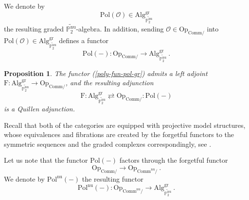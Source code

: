 \documentclass[10pt, oneside]{amsart}
\theoremstyle{plain}
\newtheorem{proposition}[equation]{Proposition}
\newcommand{\alg}{\mathrm{Alg}}
\newcommand{\comm}{\mathrm{Comm}}
\newcommand{\f}{\mathrm{F}}
\newcommand{\gr}{\mathrm{gr}}
\renewcommand{\nu}{\mathrm{nu}}
\renewcommand{\O}{\mathcal{O}}
\newcommand{\op}{\mathrm{Op}}
\newcommand{\pol}{\mathrm{Pol}}
\newcommand{\tP}{{\widetilde{\mathbb{P}^\mathrm{nu}_2}}}
\begin{document}
\begin{definition}\label{poly-def-pol-gr}
We denote by
\begin{equation*}
\pol(\O) \in \alg^\gr_\tP
\end{equation*}
the resulting graded $\tP$-algebra. In addition, sending $\O \in \op_{\comm/}$ into $\pol(\O) \in \alg^\gr_\tP$ defines a functor
\begin{equation}\label{poly-fun-pol-gr}
\pol(-) \colon \op_{\comm/} \to \alg^\gr_\tP \:.
\end{equation}
\end{definition}



\begin{proposition}\label{main-prop}
The functor (\ref{poly-fun-pol-gr}) admits a left adjoint $\f \colon \alg^\gr_\tP \longrightarrow \op_{\comm/}$, and the resulting 
adjunction
\begin{equation*}
\f \colon \alg^\gr_\tP \rightleftarrows \op_{\comm/} : \pol(-)
\end{equation*}
is a Quillen adjunction.
\end{proposition}

Recall that both of the categories are equipped with projective model structures, whose equivalences and fibrations
are created by the forgetful functors to the symmetric sequences and the graded complexes correspondingly, see \cite{Hinich}.

Let us note that the functor $\pol(-)$ factors through the forgetful functor
\begin{equation*}
\op_{\comm/} \longrightarrow \op_{\comm^\nu/} \:.
\end{equation*}
We denote by $\pol^\nu(-)$ the resulting functor
\begin{equation*}
\pol^\nu(-) \colon \op_{\comm^\nu/} \longrightarrow \alg^\gr_\tP \:.
\end{equation*}
\end{document}
